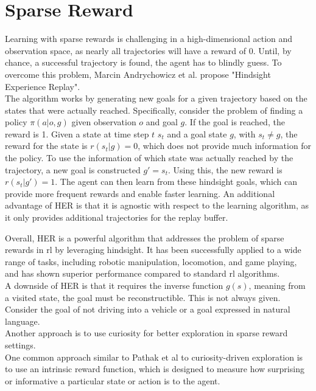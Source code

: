 \section{Sparse Reward}
\label{sec:HER}
Learning with sparse rewards is challenging in a high-dimensional action and observation space, as nearly all trajectories will have a reward of 0.
Until, by chance, a successful trajectory is found, the agent has to blindly guess. To overcome this problem, Marcin Andrychowicz et al. \cite{andrychowicz2018hindsight} 
propose "Hindsight Experience Replay".\\

The algorithm works by generating new goals for a given trajectory based on the states that were actually reached.
Specifically, consider the problem of finding a policy $\pi(a|o, g)$ given observation $o$ and goal $g$.
If the goal is reached, the reward is 1. Given a state at time step $t$ $s_t$ and a goal state $g$, with $s_t \neq g$,
the reward for the state is $r(s_t|g) = 0$, which does not provide much information for the policy.
To use the information of which state was actually reached by the trajectory, a new goal is constructed $g' = s_t$. Using this, the new reward is $r(s_t|g') = 1$.
The agent can then learn from these hindsight goals, which can provide more frequent rewards and enable faster learning. An additional advantage of HER is that it is agnostic with respect to the learning algorithm, as it only provides additional trajectories for the replay buffer.

Overall, HER is a powerful algorithm that addresses the problem of sparse rewards in \ac{rl} by leveraging hindsight. It has been successfully applied to a wide range of tasks, 
including robotic manipulation, locomotion, and game playing, and has shown superior performance compared to standard \ac{rl} algorithms.\\

A downside of HER is that it requires the inverse function $g(s)$, meaning from a visited state, the goal must be reconstructible. This is not always given.
Consider the goal of not driving into a vehicle or a goal expressed in natural language. \\

Another approach is to use curiosity for better exploration in sparse reward settings.\\

One common approach similar to Pathak et al \cite{pathak2017curiositydriven} to curiosity-driven exploration is to use an intrinsic reward function, which is designed to 
measure how surprising or informative a particular 
state or action is to the agent. \\

